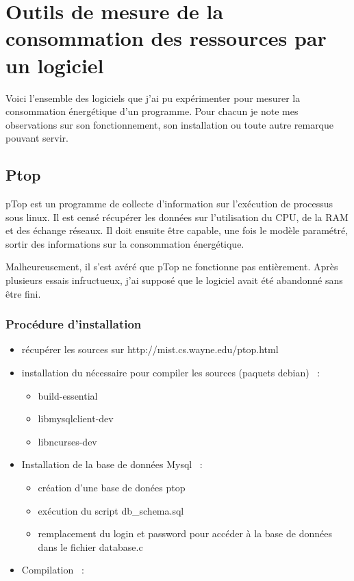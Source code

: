 \documentclass[a4paper, 11pt]{report}
\begin{document}
	\section{Outils de mesure de la consommation des ressources par un logiciel}
Voici l'ensemble des logiciels que j'ai pu expérimenter pour mesurer la consommation énergétique d'un programme. Pour chacun je note mes observations sur son fonctionnement, son installation ou toute autre remarque pouvant servir.
		\subsection{Ptop}
pTop est un programme de collecte d’information sur l'exécution de processus sous linux. Il est censé récupérer les données sur l'utilisation du CPU, de la RAM et des échange réseaux. Il doit ensuite être capable, une fois le modèle paramétré, sortir des informations sur la consommation énergétique.

Malheureusement, il s'est avéré que pTop ne fonctionne pas entièrement. Après plusieurs essais infructueux, j'ai supposé que le logiciel avait été abandonné sans être fini.

			\subsubsection{Procédure d'installation}
\begin{itemize}
    \item récupérer les sources sur http://mist.cs.wayne.edu/ptop.html
    \item installation du nécessaire pour compiler les sources (paquets debian) ~:
    \begin{itemize}
	\item build-essential
	\item libmysqlclient-dev
	\item libncurses-dev
    \end{itemize}
    \item Installation de la base de données Mysql ~:
    \begin{itemize}
	\item création d’une base de donées ptop
	\item exécution du script db\_schema.sql
	\item remplacement du login et password pour accéder à la base de données dans le fichier database.c
    \end{itemize}
    \item Compilation ~:
\end{itemize}
\end{document}
